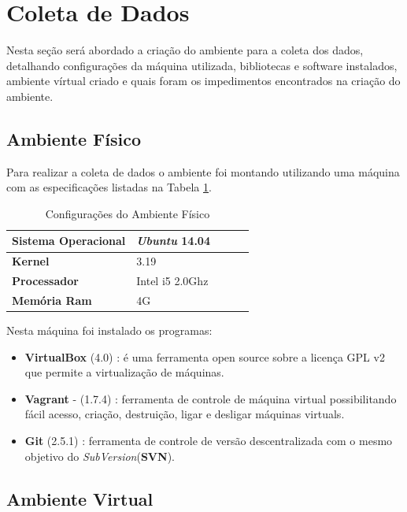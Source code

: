\section{Coleta de Dados}

Nesta seção será abordado a criação do ambiente para a coleta dos dados,
 detalhando configurações da máquina utilizada, bibliotecas e software instalados,
ambiente vírtual criado e quais foram os impedimentos encontrados na criação do ambiente.	

\subsection{Ambiente Físico}

	Para realizar a coleta de dados o ambiente foi montando
 utilizando uma máquina com as especificações listadas na Tabela
 \ref{configuracoes_ambiente_fisico}.

\begin{table}[h]
\centering
\begin{tabular}{lllll}
\textbf{Sistema Operacional} & \textit{Ubuntu} 14.04 \\ \toprule
\textbf{Kernel} & 3.19  \\ \midrule 
\textbf{Processador} & Intel i5 2.0Ghz \\ \midrule
\textbf{Memória Ram} & 4G  \\ \bottomrule 
\end{tabular} 
\caption{Configurações do Ambiente Físico}
\label{configuracoes_ambiente_fisico}
\end{table}


Nesta máquina foi instalado os programas:

\begin{itemize}
    \item \textbf{VirtualBox} (4.0) : é uma ferramenta open source sobre a
 licença GPL v2 que permite a virtualização de máquinas.
    \item \textbf{Vagrant} - (1.7.4) : ferramenta de controle de
 máquina virtual possibilitando fácil acesso, criação, destruição, ligar e 
desligar máquinas virtuals.
    \item \textbf{Git} (2.5.1) : ferramenta de controle de versão descentralizada
com o mesmo objetivo do \textit{SubVersion}(\textbf{SVN}).
\end{itemize}

\subsection{Ambiente Virtual}

